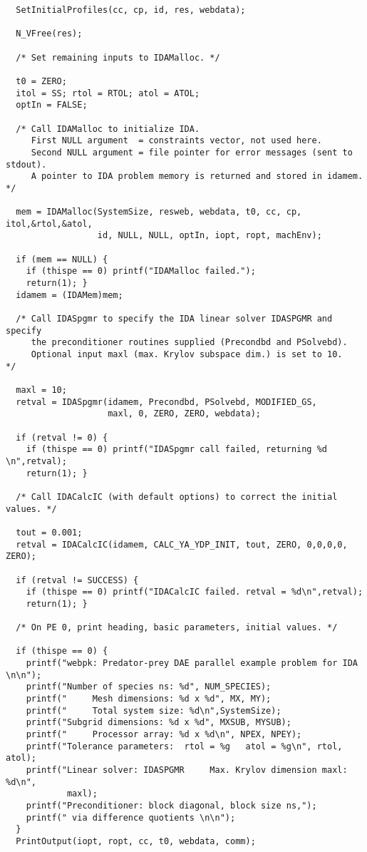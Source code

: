 \documentclass[11pt]{article}
\begin{document}
\begin{verbatim}
  SetInitialProfiles(cc, cp, id, res, webdata);

  N_VFree(res);

  /* Set remaining inputs to IDAMalloc. */

  t0 = ZERO;
  itol = SS; rtol = RTOL; atol = ATOL;
  optIn = FALSE;

  /* Call IDAMalloc to initialize IDA.
     First NULL argument  = constraints vector, not used here.
     Second NULL argument = file pointer for error messages (sent to stdout).
     A pointer to IDA problem memory is returned and stored in idamem.      */

  mem = IDAMalloc(SystemSize, resweb, webdata, t0, cc, cp, itol,&rtol,&atol,
                  id, NULL, NULL, optIn, iopt, ropt, machEnv);

  if (mem == NULL) {
    if (thispe == 0) printf("IDAMalloc failed.");
    return(1); }
  idamem = (IDAMem)mem;

  /* Call IDASpgmr to specify the IDA linear solver IDASPGMR and specify
     the preconditioner routines supplied (Precondbd and PSolvebd).
     Optional input maxl (max. Krylov subspace dim.) is set to 10.   */

  maxl = 10;
  retval = IDASpgmr(idamem, Precondbd, PSolvebd, MODIFIED_GS,
                    maxl, 0, ZERO, ZERO, webdata);

  if (retval != 0) {
    if (thispe == 0) printf("IDASpgmr call failed, returning %d \n",retval);
    return(1); }

  /* Call IDACalcIC (with default options) to correct the initial values. */

  tout = 0.001;
  retval = IDACalcIC(idamem, CALC_YA_YDP_INIT, tout, ZERO, 0,0,0,0, ZERO);

  if (retval != SUCCESS) {
    if (thispe == 0) printf("IDACalcIC failed. retval = %d\n",retval);
    return(1); }

  /* On PE 0, print heading, basic parameters, initial values. */
 
  if (thispe == 0) {
    printf("webpk: Predator-prey DAE parallel example problem for IDA \n\n");
    printf("Number of species ns: %d", NUM_SPECIES);
    printf("     Mesh dimensions: %d x %d", MX, MY);
    printf("     Total system size: %d\n",SystemSize);
    printf("Subgrid dimensions: %d x %d", MXSUB, MYSUB);
    printf("     Processor array: %d x %d\n", NPEX, NPEY);
    printf("Tolerance parameters:  rtol = %g   atol = %g\n", rtol, atol);
    printf("Linear solver: IDASPGMR     Max. Krylov dimension maxl: %d\n",
            maxl);
    printf("Preconditioner: block diagonal, block size ns,"); 
    printf(" via difference quotients \n\n");
  }
  PrintOutput(iopt, ropt, cc, t0, webdata, comm);


\end{verbatim}
\end{document}
